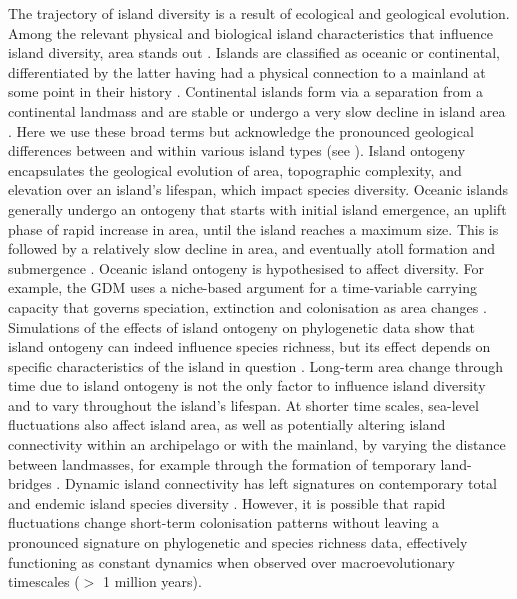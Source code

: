 \documentclass{article}
\begin{document}
The trajectory of island diversity is a result of ecological and geological evolution. Among the relevant physical and biological island characteristics that influence island diversity, area stands out \citep{ali_islands_2017}. Islands are classified as oceanic or continental, differentiated by the latter having had a physical connection to a mainland at some point in their history \citep{wallace_island_1880, ali_islands_2018}. Continental islands form via a separation from a continental landmass and are stable or undergo a very slow decline in island area \citep{ali_islands_2018}. Here we use these broad terms but acknowledge the pronounced geological differences between and within various island types (see \cite{ali_islands_2017, ali_islands_2018}). Island ontogeny encapsulates the geological evolution of area, topographic complexity, and elevation over an island’s lifespan, which impact species diversity. Oceanic islands generally undergo an ontogeny that starts with initial island emergence, an uplift phase of rapid increase in area, until the island reaches a maximum size. This is followed by a relatively slow decline in area, and eventually atoll formation and submergence \citep{ramalho_coastal_2013, ali_islands_2017}. Oceanic island ontogeny is hypothesised to affect diversity. For example, the GDM uses a niche-based argument for a time-variable carrying capacity that governs speciation, extinction and colonisation as area changes \citep{whittaker_general_2008}. Simulations of the effects of island ontogeny on phylogenetic data show that island ontogeny can indeed influence species richness, but its effect depends on specific characteristics of the island in question \citep{valente_effects_2014}. Long-term area change through time due to island ontogeny is not the only factor to influence island diversity and to vary throughout the island’s lifespan. At shorter time scales, sea-level fluctuations also affect island area, as well as potentially altering island connectivity within an archipelago or with the mainland, by varying the distance between landmasses, for example through the formation of temporary land-bridges \citep{ali_exploring_2014, fernandezpalacios_towards_2016, hammoud_past_2021}. Dynamic island connectivity has left signatures on contemporary total and endemic island species diversity \citep{weigelt_late_2016, norder_beyond_2019}. However, it is possible that rapid fluctuations change short-term colonisation patterns without leaving a pronounced signature on phylogenetic and species richness data, effectively functioning as constant dynamics when observed over macroevolutionary timescales ($>$ 1 million years). \\
\end{document}
